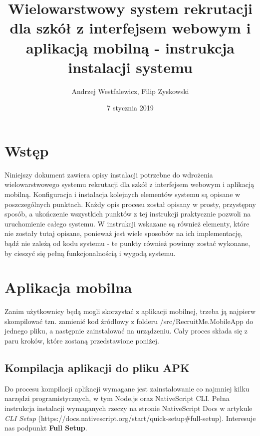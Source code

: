 \documentclass{article}
\title{Wielowarstwowy system rekrutacji dla szkół z interfejsem webowym i aplikacją mobilną - instrukcja instalacji systemu}
\author{Andrzej Westfalewicz, Filip Zyskowski}
\date{7 stycznia 2019}
\begin{document}
\begin{titlepage}
\maketitle
\end{titlepage}

\tableofcontents

\pagebreak

\section{Wstęp}
Niniejszy dokument zawiera opisy instalacji potrzebne do wdrożenia wielowarstwowego systemu rekrutacji dla szkół z interfejsem webowym i aplikacją mobilną. Konfiguracja i instalacja kolejnych elementów systemu są opisane w poszczególnych punktach. Każdy opis procesu został opisany w prosty, przystępny sposób, a ukończenie wszystkich punktów z tej instrukcji praktycznie pozwoli na uruchomienie całego systemu. W instrukcji wskazane są również elementy, które nie zostały tutaj opisane, ponieważ jest wiele sposobów na ich implementację, bądź nie zależą od kodu systemu - te punkty również powinny zostać wykonane, by cieszyć się pełną funkcjonalnością i wygodą systemu.

\section{Aplikacja mobilna}
Zanim użytkownicy będą mogli skorzystać z aplikacji mobilnej, trzeba ją najpierw skompilować tzn. zamienić kod źródłowy z folderu \linebreak /src/RecruitMe.MobileApp do jednego pliku, a następnie zainstalować na \linebreak urządzeniu. Cały proces składa się z paru kroków, które zostaną przedstawione poniżej.

\subsection{Kompilacja aplikacji do pliku APK}
Do procesu kompilacji aplikacji wymagane jest zainstalowanie co najmniej kilku narzędzi programistycznych, w tym Node.js oraz NativeScript CLI. Pełna instrukcja instalacji wymaganych rzeczy na stronie NativeScript Docs w artykule \emph{CLI Setup} (https://docs.nativescript.org/start/quick-setup\#full-setup). Interesuje nas podpunkt \textbf{Full Setup}.
\end{document}
